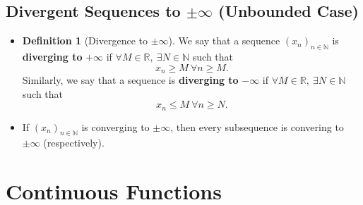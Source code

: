 \documentclass{article}
\newcommand{\R}{\mathbb{R}}
\newcommand{\N}{\mathbb{N}}
\newcommand{\seq}[2]{(#1_{#2})_{#2 \in \N}}
\newcommand{\?}{\stackrel{?}{=}}
\theoremstyle{definition} %
\newtheorem{definition}[subsection]{Definition} %
\begin{document}
\subsection{Divergent Sequences to $\pm \infty$ (Unbounded Case)}

\begin{itemize}
    \item[]
          \begin{definition}[Divergence to $\pm \infty$]
              We say that a sequence $\seq{x}{n}$ is \textbf{diverging to} $+\infty$ if $\forall M \in \R, \ \exists N \in \N$ such that
              $$x_n \geq M \ \forall n \geq M.$$
              Similarly, we say that a sequence is \textbf{diverging to} $-\infty$ if $\forall M \in \R, \ \exists N \in \N$ such that
              $$x_n \leq M \ \forall n \geq N.$$
          \end{definition}
    \item[]
          \begin{lemma}
              If $\seq{x}{n}$ is converging to $\pm \infty$, then every subsequence is convering to $\pm \infty$ (respectively).
          \end{lemma}
\end{itemize}

\section{Continuous Functions}
\end{document}
